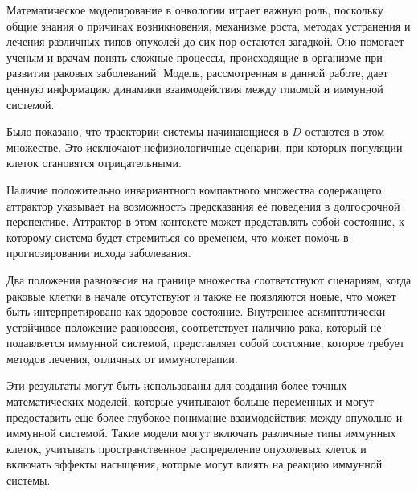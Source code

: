 \documentclass[14pt,a4paper]{extarticle}
\begin{document}
	\begin{conclusion}
	Математическое моделирование в онкологии играет важную роль, поскольку общие знания о причинах возникновения, механизме роста, методах устранения и лечения различных типов опухолей до сих пор остаются загадкой. Оно помогает ученым и врачам понять сложные процессы, происходящие в организме при развитии раковых заболеваний. Модель, рассмотренная в данной работе, дает ценную информацию динамики взаимодействия между глиомой и иммунной системой.
	
	Было показано, что траектории системы начинающиеся в $D$ остаются в этом множестве. Это исключают нефизиологичные сценарии, при которых популяции клеток становятся отрицательными.
	
	Наличие положительно инвариантного компактного множества содержащего аттрактор указывает на возможность предсказания её поведения в долгосрочной перспективе. Аттрактор в этом контексте может представлять собой состояние, к которому система будет стремиться со временем, что может помочь в прогнозировании исхода заболевания.

	Два положения равновесия на границе множества соответствуют сценариям, когда раковые клетки в начале отсутствуют и также не появляются новые, что может быть интерпретировано как здоровое состояние. Внутреннее асимптотически устойчивое положение равновесия, соответствует наличию рака, который не подавляется иммунной системой, представляет собой состояние, которое требует методов лечения, отличных от иммунотерапии.
	
	Эти результаты могут быть использованы для создания более точных математических моделей, которые учитывают больше переменных и могут предоставить еще более глубокое понимание взаимодействия между опухолью и иммунной системой. Такие модели могут включать различные типы иммунных клеток, учитывать пространственное распределение опухолевых клеток и включать эффекты насыщения, которые могут влиять на реакцию иммунной системы.
	\end{conclusion}
	
\end{document}

